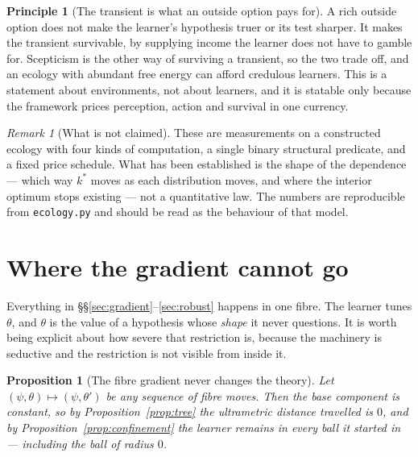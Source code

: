 \documentclass[11pt,a4paper]{article}
\theoremstyle{plain}
\newtheorem{proposition}[theorem]{Proposition}
\theoremstyle{definition}
\newtheorem{principle}[theorem]{Principle}
\theoremstyle{remark}
\newtheorem{remark}[theorem]{Remark}
\begin{document}
\begin{principle}[The transient is what an outside option pays for]
\label{prin:outside}
A rich outside option does not make the learner's hypothesis truer or its test
sharper. It makes the transient survivable, by supplying income the learner does
not have to gamble for. Scepticism is the other way of surviving a transient, so
the two trade off, and an ecology with abundant free energy can afford credulous
learners. This is a statement about environments, not about learners, and it is
statable only because the framework prices perception, action and survival in one
currency.
\end{principle}

\begin{remark}[What is not claimed]\label{rem:notclaimed}
These are measurements on a constructed ecology with four kinds of computation, a
single binary structural predicate, and a fixed price schedule. What has been
established is the shape of the dependence --- which way $k^*$ moves as each
distribution moves, and where the interior optimum stops existing --- not a
quantitative law. The numbers are reproducible from \texttt{ecology.py} and should
be read as the behaviour of that model.
\end{remark}

\section{Where the gradient cannot go}\label{sec:base}

Everything in \S\S\ref{sec:gradient}--\ref{sec:robust} happens in one fibre. The
learner tunes $\theta$, and $\theta$ is the value of a hypothesis whose
\emph{shape} it never questions. It is worth being explicit about how severe that
restriction is, because the machinery is seductive and the restriction is not
visible from inside it.

\begin{proposition}[The fibre gradient never changes the theory]\label{prop:nobase}
Let $(\psi,\theta) \mapsto (\psi,\theta')$ be any sequence of fibre moves. Then
the base component is constant, so by Proposition~\ref{prop:tree} the ultrametric
distance travelled is $0$, and by Proposition~\ref{prop:confinement} the learner
remains in every ball it started in --- including the ball of radius $0$.
\end{proposition}
\end{document}
